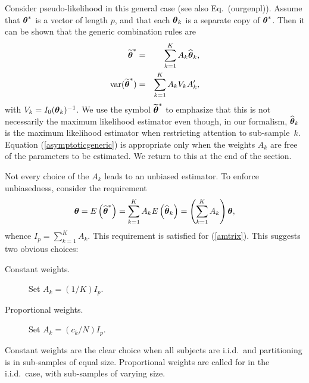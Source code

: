 \documentclass[11pt,a5paper,twoside]{book}
\newcommand{\bftheta}{\mbox{\boldmath $\theta$}}
\begin{document}
Consider pseudo-likelihood  in this general case (see also Eq.~(ourgenpl)).
Assume that $\bftheta^\ast$ is a vector of length $p$, and that 
each $\bftheta_k$ is a separate copy of $\bftheta^\ast$. Then 
it can be shown that the generic combination 
rules are 
\begin{eqnarray}
\label{schattergeneric}
\widetilde{\bftheta}^*&=&\sum_{k=1}^KA_k\widehat{\bftheta}_k,\\
\label{asymptoticgeneric}
\mbox{var}(\widetilde{\bftheta}^*)&=&\sum_{k=1}^KA_kV_kA_k',
\end{eqnarray}
with
$V_k=I_0({\bftheta}_k)^{-1}$. We use the symbol $\widetilde{\bftheta}^*$ to emphasize that this is not necessarily the maximum likelihood estimator even though, in our formalism, $\widehat{\bftheta}_k$ is the maximum likelihood estimator when restricting attention to sub-sample~$k$. 
Equation (\ref{asymptoticgeneric}) is appropriate only when the weights 
$A_k$ are free of the parameters to be estimated. We return to this at 
the end of the section.

Not every choice of the $A_k$ leads to an unbiased estimator. To enforce 
unbiasedness, consider the requirement
$$\bftheta=E\left(\widehat{\bftheta}^*\right)=\sum_{k=1}^KA_kE\left(\widehat{\bftheta}_k\right)=
\left(\sum_{k=1}^KA_k\right)\bftheta,$$
whence $I_p=\sum_{k=1}^KA_k$. This requirement is satisfied for (\ref{amtrix}).
This suggests two obvious choices:
\begin{description}
\item[Constant weights.] Set $A_k=(1/K)I_{p}$.
\item[Proportional weights.] Set $A_k=(c_k/N)I_p$.
\end{description}
Constant weights are the clear choice when all subjects are i.i.d.\ 
and partitioning is in sub-samples of equal size. Proportional weights 
are called for in the i.i.d.\ case,  with sub-samples of varying size.
\end{document}
